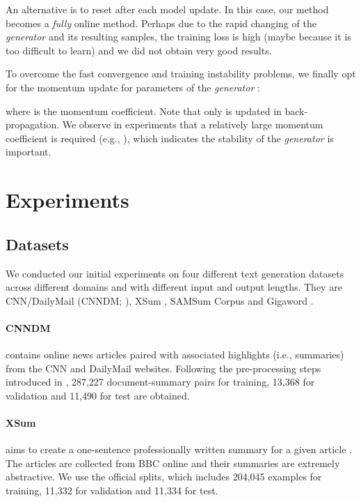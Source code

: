 \documentclass{article}
\begin{document}
An alternative is to reset  after each model update. In this case, our method becomes a \emph{fully} online method. Perhaps due to the rapid changing of the \emph{generator}  and its resulting  samples, the training loss is high (maybe because it is too difficult to learn) and we did not obtain very good results. 

To overcome the fast convergence and training instability problems, we finally opt for the momentum update for parameters of the \emph{generator} :

where  is the momentum coefficient. Note that only  is updated in back-propagation. We observe in experiments that a relatively large momentum coefficient is required (e.g., ), which indicates the stability of the \emph{generator}  is important.

\section{Experiments}

\subsection{Datasets}
We conducted our initial experiments on four different text generation datasets across different domains and with different input and output lengths. They are CNN/DailyMail (CNNDM; \citealt{nallapati2016abstractive}), XSum \citep{narayan2018don}, SAMSum Corpus \cite{gliwa-etal-2019-samsum} and Gigaword \citep{napoles2012annotated}.

\paragraph{CNNDM} contains online news articles paired with associated highlights (i.e., summaries) from the CNN and DailyMail websites. Following the pre-processing steps introduced in \cite{see-etal-2017-get},  287,227 document-summary pairs for training, 13,368 for validation and
11,490 for test are obtained.

\paragraph{XSum} aims to create a one-sentence professionally written summary for a given article \cite{narayan2018don}. The articles are collected from BBC online and their summaries are extremely abstractive. We use the official splits, which includes 204,045 examples for training, 11,332 for validation and 11,334 for test.
\end{document}
